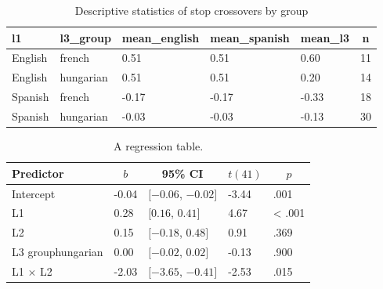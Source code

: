 \documentclass[
  english,
  man]{apa6}
\begin{document}
\begin{table}[tbp]

\begin{center}
\begin{threeparttable}

\caption{\label{tab:unnamed-chunk-5}Descriptive statistics of stop crossovers by group}

\begin{tabular}{llllll}
\toprule
l1 & \multicolumn{1}{c}{l3\_group} & \multicolumn{1}{c}{mean\_english} & \multicolumn{1}{c}{mean\_spanish} & \multicolumn{1}{c}{mean\_l3} & \multicolumn{1}{c}{n}\\
\midrule
English & french & 0.51 & 0.51 & 0.60 & 11\\
English & hungarian & 0.51 & 0.51 & 0.20 & 14\\
Spanish & french & -0.17 & -0.17 & -0.33 & 18\\
Spanish & hungarian & -0.03 & -0.03 & -0.13 & 30\\
\bottomrule
\end{tabular}

\end{threeparttable}
\end{center}

\end{table}

\begin{table}[tbp]

\begin{center}
\begin{threeparttable}

\caption{\label{tab:unnamed-chunk-6}A regression table.}

\begin{tabular}{lllll}
\toprule
Predictor & \multicolumn{1}{c}{$b$} & \multicolumn{1}{c}{95\% CI} & \multicolumn{1}{c}{$t(41)$} & \multicolumn{1}{c}{$p$}\\
\midrule
Intercept & -0.04 & $[-0.06$, $-0.02]$ & -3.44 & .001\\
L1 & 0.28 & $[0.16$, $0.41]$ & 4.67 & < .001\\
L2 & 0.15 & $[-0.18$, $0.48]$ & 0.91 & .369\\
L3 grouphungarian & 0.00 & $[-0.02$, $0.02]$ & -0.13 & .900\\
L1 $\times$ L2 & -2.03 & $[-3.65$, $-0.41]$ & -2.53 & .015\\
\bottomrule
\end{tabular}

\end{threeparttable}
\end{center}

\end{table}
\end{document}
